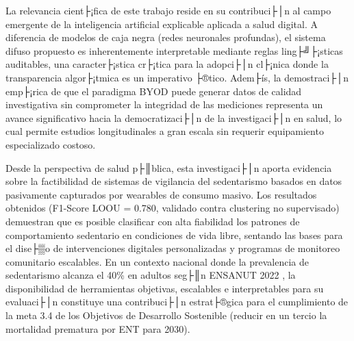 La relevancia cient├¡fica de este trabajo reside en su contribuci├│n al campo emergente de la inteligencia artificial explicable aplicada a salud digital. A diferencia de modelos de caja negra (redes neuronales profundas), el sistema difuso propuesto es inherentemente interpretable mediante reglas ling├╝├¡sticas auditables, una caracter├¡stica cr├¡tica para la adopci├│n cl├¡nica donde la transparencia algor├¡tmica es un imperativo ├®tico. Adem├ís, la demostraci├│n emp├¡rica de que el paradigma BYOD puede generar datos de calidad investigativa sin comprometer la integridad de las mediciones representa un avance significativo hacia la democratizaci├│n de la investigaci├│n en salud, lo cual permite estudios longitudinales a gran escala sin requerir equipamiento especializado costoso.

Desde la perspectiva de salud p├║blica, esta investigaci├│n aporta evidencia sobre la factibilidad de sistemas de vigilancia del sedentarismo basados en datos pasivamente capturados por wearables de consumo masivo. Los resultados obtenidos (F1-Score LOOU = 0.780, validado contra clustering no supervisado) demuestran que es posible clasificar con alta fiabilidad los patrones de comportamiento sedentario en condiciones de vida libre, sentando las bases para el dise├▒o de intervenciones digitales personalizadas y programas de monitoreo comunitario escalables. En un contexto nacional donde la prevalencia de sedentarismo alcanza el 40\% en adultos seg├║n ENSANUT 2022 \citep{Shamah-Levy2023ENSANUT}, la disponibilidad de herramientas objetivas, escalables e interpretables para su evaluaci├│n constituye una contribuci├│n estrat├®gica para el cumplimiento de la meta 3.4 de los Objetivos de Desarrollo Sostenible (reducir en un tercio la mortalidad prematura por ENT para 2030).
